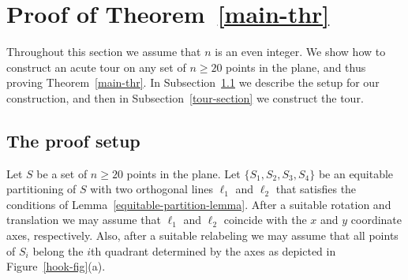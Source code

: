 \documentclass[11pt,letter]{article}
\newtheorem{lemma}{Lemma}
\begin{document}
\section{Proof of Theorem~\ref{main-thr}}

Throughout this section we assume that $n$ is an even integer. We show how to construct an acute tour on any set of $n\geqslant 20$ points in the plane, and thus proving Theorem~\ref{main-thr}. In Subsection~\ref{setup-section} we describe the setup for our construction, and then in Subsection~\ref{tour-section} we construct the tour.  

\subsection{The proof setup}

\label{setup-section}
\iffalse
\begin{lemma}
	\label{convex-quadruple-lemma}
	Let $p,q,r,s$ be the points of a convex quadruple that appear in this order along the boundary of their convex hull. Then the 4-cycle $prsqp$ or the 4-cycle $prqsp$ is acute.
\end{lemma}

\begin{proof}
	Let $x$ denote the intersection point of the diagonals $pr$ and $qs$. If $\angle pxq \geqslant \pi/2$ then the cycle $prsqp$ is acute, otherwise (i.e. if $\angle pxs > \pi/2$) the cycle $prqsp$ is acute.
\end{proof}




\begin{lemma}
	\label{acute-quadruple-lemma}
	Let $\{p,q,r,s\}$ be an acute quadruple with center $s$, and let $\angle psq$ be its acute angle. Then the 4-cycle $psqrp$ is acute.
\end{lemma}
\begin{proof}
	Observe that $\angle sqr + \angle qrp + \angle rps = \angle psq \leqslant \pi/2$. Thus, the cycle $psqrp$ is acute.
\end{proof}
\fi


Let $S$ be a set of $n\geqslant 20$ points in the plane. Let $\{S_1, S_2, S_3, S_4\}$ be an equitable partitioning of $S$ with two orthogonal lines $\ell_1$ and $\ell_2$ that satisfies the conditions of Lemma~\ref{equitable-partition-lemma}. After a suitable rotation and translation we may assume that $\ell_1$ and $\ell_2$ coincide with the $x$ and $y$ coordinate axes, respectively. Also, after a suitable relabeling we may assume that all points of $S_i$ belong the $i$th quadrant determined by the axes as depicted in Figure~\ref{hook-fig}(a).
\end{document}
